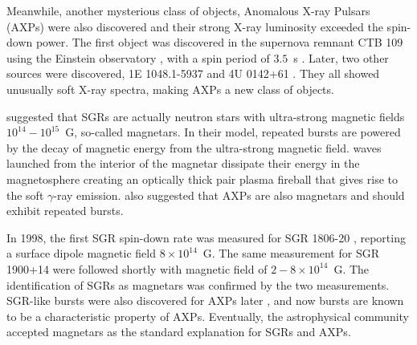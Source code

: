 Meanwhile, another mysterious class of objects, Anomalous X-ray Pulsars (AXPs) were also discovered and their strong X-ray luminosity exceeded the spin-down power.
The first object was discovered in the supernova remnant CTB 109 using the Einstein observatory \citep{1980Natur.287..805G}, with a spin period of $3.5$~s \citep{1981Natur.293..202F}.
Later, two other sources were discovered, 1E 1048.1-5937 \citep{1986ApJ...305..814S} and 4U 0142+61 \citep{1994MNRAS.267..490H,1994ApJ...433L..25I}. They all showed unusually soft X-ray spectra, making AXPs a new class of objects.

\citet{1995MNRAS.275..255T,1996ApJ...473..322T} suggested that SGRs are actually neutron stars with ultra-strong magnetic fields $10^{14}-10^{15}$~G, so-called magnetars.
In their model, repeated bursts are powered by the decay of magnetic energy from the ultra-strong magnetic field.
\alfven waves launched from the interior of the magnetar dissipate their energy in the magnetosphere creating an optically thick pair plasma fireball that gives rise to the soft $\gamma$-ray emission.
\citet{1996ApJ...473..322T} also suggested that AXPs are also magnetars and should exhibit repeated bursts.

In 1998, the first SGR spin-down rate was measured for SGR 1806-20 \citep{1998Natur.393..235K}, reporting a surface dipole magnetic field $8\times 10^{14}$~G. The same measurement for SGR 1900+14 were followed shortly \citep{1999ApJ...510L.115K} with magnetic field of $2-8\times 10^{14}$~G.
The identification of SGRs as magnetars was confirmed by the two measurements.
SGR-like bursts were also discovered for AXPs later \citep{2002Natur.419..142G,2003ApJ...596L..71K}, and now bursts are known to be a characteristic property of AXPs.
Eventually, the astrophysical community accepted magnetars as the standard explanation for SGRs and AXPs.


